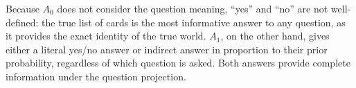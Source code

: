 \documentclass[12pt, floatsintext, jou]{apa6}
\begin{document}


Because $A_0$ does not consider the question meaning, ``yes'' and ``no'' are not well-defined: the true list of cards is the most informative answer to any question, as it provides the exact identity of the true world. $A_1$, on the other hand, gives either a literal yes/no answer or indirect answer in proportion to their prior probability, regardless of which question is asked. Both answers provide complete information under the question projection.
\end{document}
